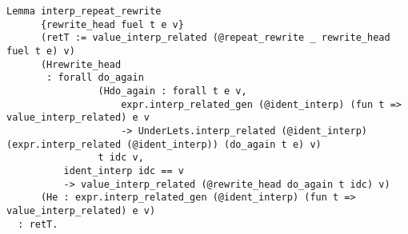 \documentclass[
]{article}
\begin{document}
\begin{itemize}
\begin{itemize}
\begin{itemize}
\begin{verbatim}
Lemma interp_repeat_rewrite
      {rewrite_head fuel t e v}
      (retT := value_interp_related (@repeat_rewrite _ rewrite_head fuel t e) v)
      (Hrewrite_head
       : forall do_again
                (Hdo_again : forall t e v,
                    expr.interp_related_gen (@ident_interp) (fun t => value_interp_related) e v
                    -> UnderLets.interp_related (@ident_interp) (expr.interp_related (@ident_interp)) (do_again t e) v)
                t idc v,
          ident_interp idc == v
          -> value_interp_related (@rewrite_head do_again t idc) v)
      (He : expr.interp_related_gen (@ident_interp) (fun t => value_interp_related) e v)
  : retT.
\end{verbatim}
    \end{itemize}
  \end{itemize}
\end{itemize}
\end{document}
